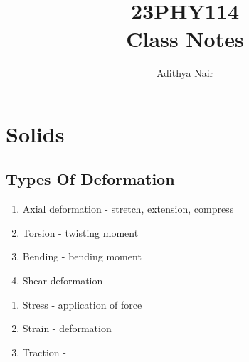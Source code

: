 \documentclass{report}
\title{\Huge{23PHY114}\\ Class Notes}
\author{\huge{Adithya Nair}}
\date{}
\begin{document}
\maketitle
\newpage%
\tableofcontents
\chapter{Solids}
\section{Types Of Deformation}
\begin{enumerate}
	\item Axial deformation - stretch, extension, compress
	\item Torsion - twisting moment
	\item Bending - bending moment
	\item Shear deformation
\end{enumerate}
\begin{enumerate}
	\item Stress - application of force
	\item Strain - deformation
	\item Traction - 
\end{enumerate}
\end{document}
